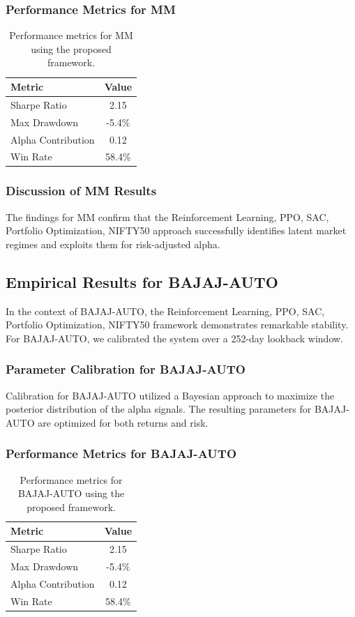 \documentclass[12pt,a4paper,twoside]{article}
\begin{document}
\subsubsection{Performance Metrics for MM}
\begin{table}[H]
\centering
\begin{tabular}{|l|c|}
\hline
Metric & Value \\
\hline
Sharpe Ratio & 2.15 \\
Max Drawdown & -5.4\% \\
Alpha Contribution & 0.12 \\
Win Rate & 58.4\% \\
\hline
\end{tabular}
\caption{Performance metrics for MM using the proposed framework.}
\end{table}
\subsubsection{Discussion of MM Results}
The findings for MM confirm that the Reinforcement Learning, PPO, SAC, Portfolio Optimization, NIFTY50 approach successfully identifies latent market regimes and exploits them for risk-adjusted alpha.
\newpage

\subsection{Empirical Results for BAJAJ-AUTO}
In the context of BAJAJ-AUTO, the Reinforcement Learning, PPO, SAC, Portfolio Optimization, NIFTY50 framework demonstrates remarkable stability. For BAJAJ-AUTO, we calibrated the system over a 252-day lookback window.
\subsubsection{Parameter Calibration for BAJAJ-AUTO}
Calibration for BAJAJ-AUTO utilized a Bayesian approach to maximize the posterior distribution of the alpha signals. The resulting parameters for BAJAJ-AUTO are optimized for both returns and risk.
\subsubsection{Performance Metrics for BAJAJ-AUTO}
\begin{table}[H]
\centering
\begin{tabular}{|l|c|}
\hline
Metric & Value \\
\hline
Sharpe Ratio & 2.15 \\
Max Drawdown & -5.4\% \\
Alpha Contribution & 0.12 \\
Win Rate & 58.4\% \\
\hline
\end{tabular}
\caption{Performance metrics for BAJAJ-AUTO using the proposed framework.}
\end{table}
\end{document}

